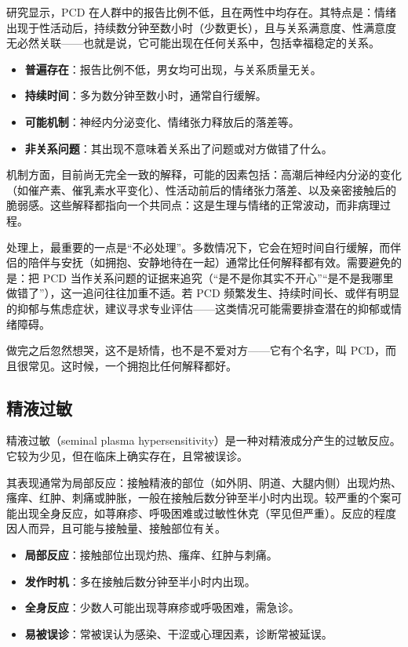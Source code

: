 \documentclass[12pt,UTF8]{ctexbook}
\begin{document}
研究显示，PCD 在人群中的报告比例不低，且在两性中均存在。其特点是：情绪出现于性活动后，持续数分钟至数小时（少数更长），且与关系满意度、性满意度无必然关联——也就是说，它可能出现在任何关系中，包括幸福稳定的关系。

\begin{itemize}
	\item \textbf{普遍存在}：报告比例不低，男女均可出现，与关系质量无关。
	\item \textbf{持续时间}：多为数分钟至数小时，通常自行缓解。
	\item \textbf{可能机制}：神经内分泌变化、情绪张力释放后的落差等。
	\item \textbf{非关系问题}：其出现不意味着关系出了问题或对方做错了什么。
\end{itemize}

机制方面，目前尚无完全一致的解释，可能的因素包括：高潮后神经内分泌的变化（如催产素、催乳素水平变化）、性活动前后的情绪张力落差、以及亲密接触后的脆弱感。这些解释都指向一个共同点：这是生理与情绪的正常波动，而非病理过程。

处理上，最重要的一点是“不必处理”。多数情况下，它会在短时间自行缓解，而伴侣的陪伴与安抚（如拥抱、安静地待在一起）通常比任何解释都有效。需要避免的是：把 PCD 当作关系问题的证据来追究（“是不是你其实不开心”“是不是我哪里做错了”），这一追问往往加重不适。若 PCD 频繁发生、持续时间长、或伴有明显的抑郁与焦虑症状，建议寻求专业评估——这类情况可能需要排查潜在的抑郁或情绪障碍。

\begin{tcolorbox}[colback=pink!5!white,colframe=red!50!black,title=贴心小叮咛]
	做完之后忽然想哭，这不是矫情，也不是不爱对方——它有个名字，叫 PCD，而且很常见。这时候，一个拥抱比任何解释都好。
\end{tcolorbox}

\subsection{精液过敏}

精液过敏（seminal plasma hypersensitivity）是一种对精液成分产生的过敏反应。它较为少见，但在临床上确实存在，且常被误诊。

其表现通常为局部反应：接触精液的部位（如外阴、阴道、大腿内侧）出现灼热、瘙痒、红肿、刺痛或肿胀，一般在接触后数分钟至半小时内出现。较严重的个案可能出现全身反应，如荨麻疹、呼吸困难或过敏性休克（罕见但严重）。反应的程度因人而异，且可能与接触量、接触部位有关。

\begin{itemize}
	\item \textbf{局部反应}：接触部位出现灼热、瘙痒、红肿与刺痛。
	\item \textbf{发作时机}：多在接触后数分钟至半小时内出现。
	\item \textbf{全身反应}：少数人可能出现荨麻疹或呼吸困难，需急诊。
	\item \textbf{易被误诊}：常被误认为感染、干涩或心理因素，诊断常被延误。
\end{itemize}
\end{document}
